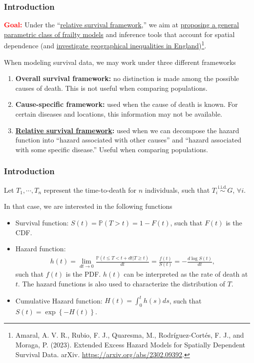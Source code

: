 \documentclass[10pt, aspectratio = 169, handout]{beamer} %
\let\oldtextbf\textbf
\renewcommand\textbf[1]{\textcolor{titles}{\oldtextbf{#1}}}
\begin{document}
	\begin{frame}[t]
		\frametitle{Introduction}
		\justifying

        {\textbf{\textcolor{red}{Goal:}}} Under the ``\ul{relative survival framework},'' we aim at \ul{proposing a general parametric class of frailty models} and inference tools that account for spatial dependence (and \ul{investigate geographical inequalities in England})\footnote{\justifying Amaral, A. V. R., Rubio, F. J., Quaresma, M.,  Rodr\'iguez-Cort\'es, F. J., and Moraga, P. (2023). Extended Excess Hazard Models for Spatially Dependent Survival Data. arXiv. \url{https://arxiv.org/abs/2302.09392}.}.

        \pause

        When modeling survival data, we may work under three different frameworks
		\begin{enumerate}
			\justifying
			\item \textbf{Overall survival framework:} no distinction is made among the possible causes of death. This is not useful when comparing populations.
			\item \textbf{Cause-specific framework:} used when the cause of death is known. For certain diseases and locations, this information may not be available.
			\item \textbf{\ul{Relative survival framework}:} used when we can decompose the hazard function into ``hazard associated with other causes'' and ``hazard associated with some specific disease.''  Useful when comparing populations.
		\end{enumerate}

	\end{frame}

    \begin{frame}[t]
		\frametitle{Introduction}
		\justifying
		Let $T_1, \cdots, T_n$ represent the time-to-death for $n$ individuals, such that $T_i \overset{\text{i.i.d.}}{\sim} G$, $\forall i$.
		
		In that case, we are interested in the following functions
		\begin{itemize}
			\justifying
			\item Survival function: $S(t) = \mathbb{P}(T > t) = 1 - F(t)$, such that $F(t)$ is the CDF.
			\item Hazard function:
			\begin{align*}
				h(t) = \lim_{dt \to 0} \frac{\mathbb{P}(t \leq T < t + dt | T \geq t)}{dt} = \frac{f(t)}{S(t)} = -\frac{d \log S(t)}{dt},
			\end{align*}
		    such that $f(t)$ is the PDF. $h(t)$ can be interpreted as the rate of death at $t$. The hazard functions is also used to characterize the distribution of $T$.
		    \item Cumulative Hazard function: $H(t) = \int_0^t h(s)ds$, such that $S(t) = \exp\left\{-H(t)\right\}$.
		\end{itemize}
	\end{frame}
	
\end{document}
